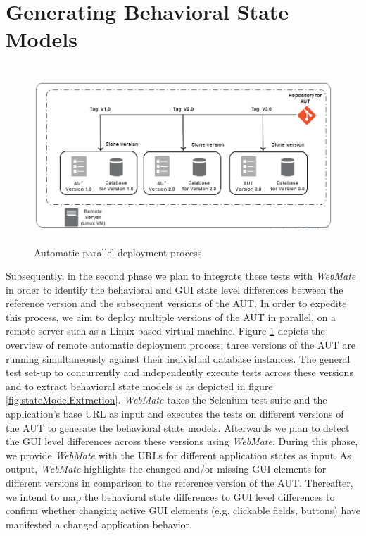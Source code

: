\section{Generating Behavioral State Models}
\label{sec:BehavModels}
\begin{figure}[h!]
\makeatletter 
\renewcommand{\thefigure}{\@arabic\c@figure}
\makeatother
    \centering
  \includegraphics[width=5.4in,height=2.6in]{./Figures/Deployment_Process_2.jpg}
  \caption{Automatic parallel deployment process}
  \label{fig:deployment} 
\end{figure}
\vspace{-2mm}
Subsequently, in the second phase we plan to integrate these tests with \textit{WebMate} in order to identify the behavioral and GUI state level differences between the reference version and the subsequent versions of the AUT. In order to expedite this process, we aim to deploy multiple versions of the AUT in parallel, on a remote server such as a Linux based virtual machine. Figure  \ref{fig:deployment} depicts the overview of remote automatic deployment process; three versions of the AUT are running simultaneously against their individual database instances. The general test set-up to concurrently and independently execute tests across these versions and to extract behavioral state models is as depicted in figure \ref{fig:stateModelExtraction}.  \textit{WebMate} takes the Selenium test suite and the application’s base URL as input and executes the tests on different versions of the AUT to generate the behavioral state models. Afterwards we plan to detect the GUI level differences across these versions using \textit{WebMate}. During this phase, we provide \textit{WebMate} with the URLs for different application states as input. As output, \textit{WebMate} highlights the changed and/or missing GUI elements for different versions in comparison to the reference version of the AUT. Thereafter, we intend to map the behavioral state differences to GUI level differences to confirm whether changing active GUI elements (e.g. clickable fields, buttons) have manifested a changed application behavior.

